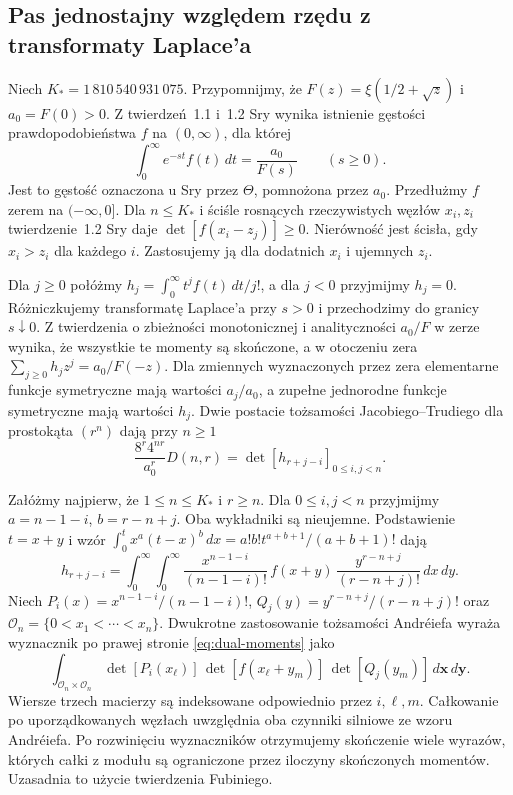 \documentclass[11pt,a4paper,reqno]{amsart}
\numberwithin{equation}{section}
\begin{document}
\subsection{Pas jednostajny względem rzędu z transformaty Laplace’a}\label{sec:sra}
Niech \(K_*=1\,810\,540\,931\,075\). Przypomnijmy, że \(F(z)=\xi(1/2+\sqrt z)\) i \(a_0=F(0)>0\).
Z twierdzeń~1.1 i~1.2 Sry \cite{sra} wynika istnienie gęstości prawdopodobieństwa \(f\) na \((0,\infty)\), dla której
\[
 \int_0^\infty e^{-st}f(t)\,dt=\frac{a_0}{F(s)}\qquad(s\ge0).
\]
Jest to gęstość oznaczona u Sry przez \(\Theta\), pomnożona przez \(a_0\). Przedłużmy \(f\) zerem na \((-\infty,0]\). Dla \(n\le K_*\) i ściśle rosnących rzeczywistych węzłów \(x_i,z_i\) twierdzenie~1.2 Sry daje \(\det[f(x_i-z_j)]\ge0\). Nierówność jest ścisła, gdy \(x_i>z_i\) dla każdego \(i\). Zastosujemy ją dla dodatnich \(x_i\) i ujemnych \(z_i\).

Dla \(j\ge0\) połóżmy \(h_j=\int_0^\infty t^j f(t)\,dt/j!\), a dla \(j<0\) przyjmijmy \(h_j=0\). Różniczkujemy transformatę Laplace’a przy \(s>0\) i przechodzimy do granicy \(s\downarrow0\). Z twierdzenia o zbieżności monotonicznej i analityczności \(a_0/F\) w zerze wynika, że wszystkie te momenty są skończone, a w otoczeniu zera \(\sum_{j\ge0}h_jz^j=a_0/F(-z)\). Dla zmiennych wyznaczonych przez zera elementarne funkcje symetryczne mają wartości \(a_j/a_0\), a zupełne jednorodne funkcje symetryczne mają wartości \(h_j\). Dwie postacie tożsamości Jacobiego--Trudiego dla prostokąta \((r^n)\) dają przy \(n\ge1\)
\begin{equation}\label{eq:dual-moments}
 \frac{8^r4^{nr}}{a_0^r}D(n,r)=\det[h_{r+j-i}]_{0\le i,j<n}.
\end{equation}

Załóżmy najpierw, że \(1\le n\le K_*\) i \(r\ge n\). Dla \(0\le i,j<n\) przyjmijmy \(a=n-1-i\), \(b=r-n+j\). Oba wykładniki są nieujemne. Podstawienie \(t=x+y\) i wzór \(\int_0^t x^a(t-x)^b\,dx=a!b!t^{a+b+1}/(a+b+1)!\) dają
\[
 h_{r+j-i}=\int_0^\infty\!\int_0^\infty
 \frac{x^{n-1-i}}{(n-1-i)!}\,f(x+y)\,
 \frac{y^{r-n+j}}{(r-n+j)!}\,dx\,dy .
\]
Niech \(P_i(x)=x^{n-1-i}/(n-1-i)!\), \(Q_j(y)=y^{r-n+j}/(r-n+j)!\) oraz \(\mathcal O_n=\{0<x_1<\cdots<x_n\}\). Dwukrotne zastosowanie tożsamości Andréiefa wyraża wyznacznik po prawej stronie \eqref{eq:dual-moments} jako
\[
 \int_{\mathcal O_n\times\mathcal O_n}
 \det[P_i(x_\ell)]\,\det[f(x_\ell+y_m)]\,
 \det[Q_j(y_m)]\,d\mathbf x\,d\mathbf y .
\]
Wiersze trzech macierzy są indeksowane odpowiednio przez \(i,\ell,m\). Całkowanie po uporządkowanych węzłach uwzględnia oba czynniki silniowe ze wzoru Andréiefa. Po rozwinięciu wyznaczników otrzymujemy skończenie wiele wyrazów, których całki z modułu są ograniczone przez iloczyny skończonych momentów. Uzasadnia to użycie twierdzenia Fubiniego.
\end{document}
